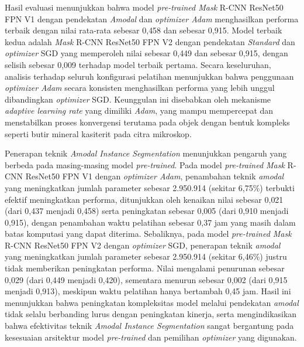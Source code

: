 \begin{center}
	Hasil evaluasi menunjukkan bahwa model \textit{pre-trained Mask} R-CNN ResNet50 FPN V1 dengan pendekatan \textit{Amodal} dan \textit{optimizer Adam} menghasilkan performa terbaik dengan nilai rata-rata \APrangefiftyy sebesar 0{,}458 dan \IoUrangefiftyy sebesar 0{,}915. Model terbaik kedua adalah \textit{Mask} R-CNN ResNet50 FPN V2 dengan pendekatan \textit{Standard} dan \textit{optimizer} SGD yang memperoleh nilai \APrangefiftyy sebesar 0{,}449 dan \IoUrangefiftyy sebesar 0{,}915, dengan selisih \APrangefiftyy sebesar 0{,}009 terhadap model terbaik pertama. Secara keseluruhan, analisis terhadap seluruh konfigurasi pelatihan menunjukkan bahwa penggunaan \textit{optimizer Adam} secara konsisten menghasilkan performa yang lebih unggul dibandingkan \textit{optimizer} SGD. Keunggulan ini disebabkan oleh mekanisme \textit{adaptive learning rate} yang dimiliki \textit{Adam}, yang mampu mempercepat dan menstabilkan proses konvergensi terutama pada objek dengan bentuk kompleks seperti butir mineral kasiterit pada citra mikroskop. \par
	
	
	Penerapan teknik \textit{Amodal Instance Segmentation} menunjukkan pengaruh yang berbeda pada masing-masing model \textit{pre-trained}. Pada model \textit{pre-trained Mask} R-CNN ResNet50 FPN V1 dengan \textit{optimizer Adam}, penambahan teknik \textit{amodal} yang meningkatkan jumlah parameter sebesar 2.950.914 (sekitar 6{,}75\%) terbukti efektif meningkatkan performa, ditunjukkan oleh kenaikan nilai \APrangefiftyy sebesar 0{,}021 (dari 0{,}437 menjadi 0{,}458) serta peningkatan \IoUrangefiftyy sebesar 0{,}005 (dari 0{,}910 menjadi 0{,}915), dengan penambahan waktu pelatihan sebesar 0{,}37 jam yang masih dalam batas komputasi yang dapat diterima. Sebaliknya, pada model \textit{pre-trained Mask} R-CNN ResNet50 FPN V2 dengan \textit{optimizer} SGD, penerapan teknik \textit{amodal} yang meningkatkan jumlah parameter sebesar 2.950.914 (sekitar 6{,}46\%) justru tidak memberikan peningkatan performa. Nilai \APrangefiftyy mengalami penurunan sebesar 0{,}029 (dari 0{,}449 menjadi 0{,}420), sementara \IoUrangefiftyy menurun sebesar 0{,}002 (dari 0{,}915 menjadi 0{,}913), meskipun waktu pelatihan hanya bertambah 0{,}45 jam. Hasil ini menunjukkan bahwa peningkatan kompleksitas model melalui pendekatan \textit{amodal} tidak selalu berbanding lurus dengan peningkatan kinerja, serta mengindikasikan bahwa efektivitas teknik \textit{Amodal Instance Segmentation} sangat bergantung pada kesesuaian arsitektur model \textit{pre-trained} dan pemilihan \textit{optimizer} yang digunakan. \par


\end{center}
